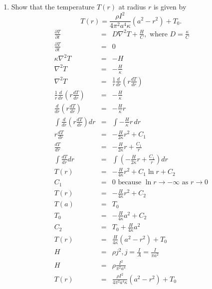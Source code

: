 \documentclass[12pt]{article}
\begin{document}
\begin{enumerate}
\begin{enumerate}
		where $j$ is the current density.
		Hint: Use the microscopic version of Ohm’s law.
		\begin{eqnarray*}
			H &=& j \cdot E\\
			E &=& \rho j\\
			H &=& j \cdot (\rho j)\\
			&=& \rho j^2.
		\end{eqnarray*}
	$$\fbox{$H = \rho j ^2$}$$			
		\pagebreak
		\item Show that the temperature $T(r)$ at radius $r$ is given by $$T(r) = \frac{\rho I^2}{4\pi^2 a^4 \kappa}(a^2 - r^2) + T_0.$$
		\begin{eqnarray*}
			\frac{\partial T}{\partial t} &=& D \nabla^2 T + \frac{H}{C}, \mbox{ where } D = \frac{\kappa}{C} \\
			\frac{\partial T}{\partial t} &=& 0 \\
			\kappa \nabla^2 T &=& -H \\
			\nabla^2 T &=& -\frac{H}{\kappa} \\
			\nabla^2 T &=& \frac{1}{r}\frac{d}{dr}\left( r \frac{dT}{dr} \right) \\
			\frac{1}{r}\frac{d}{dr}\left( r \frac{dT}{dr} \right) &=& -\frac{H}{\kappa} \\
			\frac{d}{dr}\left( r \frac{dT}{dr} \right) &=& -\frac{H}{\kappa} r \\
			\int \frac{d}{dr}\left( r \frac{dT}{dr} \right) dr &=& \int -\frac{H}{\kappa} r \, dr \\
			r \frac{dT}{dr} &=& -\frac{H}{2\kappa} r^2 + C_1 \\
			\frac{dT}{dr} &=& -\frac{H}{2\kappa} r + \frac{C_1}{r} \\
			\int \frac{dT}{dr} dr &=& \int \left( -\frac{H}{2\kappa} r + \frac{C_1}{r} \right) dr \\
			T(r) &=& -\frac{H}{4\kappa} r^2 + C_1 \ln r + C_2 \\
			C_1 &=& 0 \mbox{ because } \ln r \rightarrow -\infty \mbox{ as } r \rightarrow 0 \\
			T(r) &=& -\frac{H}{4\kappa} r^2 + C_2 \\
			T(a) &=& T_0 \\
			T_0 &=& -\frac{H}{4\kappa} a^2 + C_2 \\
			C_2 &=& T_0 + \frac{H}{4\kappa} a^2 \\
			T(r) &=& \frac{H}{4\kappa}(a^2 - r^2) + T_0 \\
			H &=& \rho j^2, j = \frac{I}{A} = \frac{I}{\pi a^2} \\
			H &=& \rho \frac{I^2}{\pi^2 a^4} \\
			T(r) &=& \frac{\rho I^2}{4\pi^2 a^4 \kappa} (a^2 - r^2) + T_0
		\end{eqnarray*}
		

\end{enumerate}
\end{enumerate}
\end{document}
